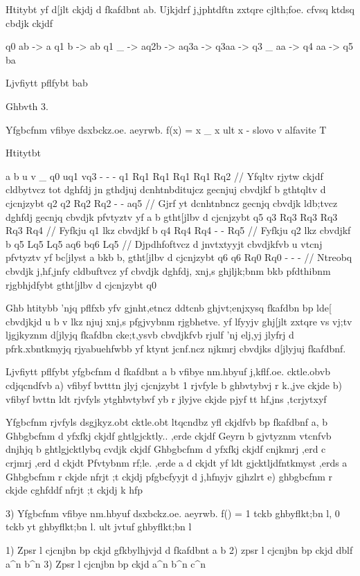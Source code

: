 Htitybt yf d[jlt ckjdj d fkafdbnt ab. Ujkjdrf j,jphtdftn zxtqre cjlth;foe. cfvsq ktdsq cbdjk ckjdf

q0 ab -> a q1 b ->  ab q1 _ -> aq2b -> aq3a -> q3aa -> q3 _ aa -> q4 aa -> q5 ba

Ljvfiytt pflfybt bab

Ghbvth 3.

Yfgbcfnm vfibye dsxbckz.oe. aeyrwb. f(x) = x _ x ult x - slovo v alfavite T

Htitytbt

	a    b    u    v   _
q0  uq1  vq3  -    -   -
q1  Rq1  Rq1  Rq1  Rq1  Rq2 // Yfqltv rjytw ckjdf cldbytvcz tot dghfdj jn gthdjuj dcnhtnbditujcz gecnjuj cbvdjkf b gthtqltv d cjcnjzybt q2
q2  Rq2  Rq2  -    -    aq5 // Gjrf yt dcnhtnbncz gecnjq cbvdjk ldb;tvcz dghfdj gecnjq cbvdjk pfvtyztv yf a b gtht[jlbv d cjcnjzybt q5
q3  Rq3  Rq3  Rq3  Rq3  Rq4  // Fyfkju q1 lkz cbvdjkf b 
q4 Rq4   Rq4  -    -    Rq5  // Fyfkju q2 lkz cbvdjkf b
q5 Lq5   Lq5  aq6  bq6 Lq5 // Djpdhfoftvcz d jnvtxtyyjt cbvdjkfvb u vtcnj pfvtyztv yf bc[jlyst a bkb b, gtht[jlbv d cjcnjzybt q6
q6 Rq0   Rq0 -     -    -   // Ntreobq cbvdjk j,hf,jnfy cldbuftvcz yf cbvdjk dghfdj, xnj,s ghjljk;bnm bkb pfdthibnm rjgbhjdfybt gtht[jlbv d cjcnjzybt q0

Ghb htitybb 'njq pflfxb yfv gjnht,etncz ddtcnb ghjvt;enjxysq fkafdbn bp lde[ cbvdjkjd u b v lkz njuj xnj,s pfgjvybnm rjgbhetve. yf lfyyjv ghj[jlt zxtqre vs vj;tv ljgjkyznm d[jlyjq fkafdbn cke;t,ysvb cbvdjkfvb rjulf 'nj elj,yj jlyfrj d pfrk.xbntkmyjq rjyabuehfwbb yf ktynt jcnf.ncz njkmrj cbvdjks d[jlyjuj fkafdbnf.

Ljvfiytt pflfybt yfgbcfnm d fkafdbnt a b vfibye nm.hbyuf j,kflf.oe. cktle.obvb cdjqcndfvb 
a) vfibyf bvtttn jlyj cjcnjzybt 1 rjvfyle b ghbvtybvj r k.,jve ckjde
b) vfibyf bvttn ldt rjvfyls ytghbvtybvf yb r jlyjve ckjde pjyf tt hf,jns ,tcrjytxyf

Yfgbcfnm rjvfyls dsgjkyz.obt cktle.obt ltqcndbz yfl ckjdfvb bp fkafdbnf a, b
Ghbgbcfnm d yfxfkj ckjdf ghtlgjcktly.. ,erde ckjdf 
Geyrn b gjvtyznm vtcnfvb dnjhjq b ghtlgjcktlybq cvdjk ckjdf
Ghbgbcfnm d yfxfkj ckjdf cnjkmrj ,erd c crjmrj ,erd d ckjdt
Pfvtybnm rf;le. ,erde a d ckjdt yf ldt gjcktljdfntkmyst ,erds a
Ghbgbcfnm r ckjde nfrjt ;t ckjdj pfgbcfyyjt d j,hfnyjv gjhzlrt
e) ghbgbcfnm r ckjde cghfddf nfrjt ;t ckjdj k hfp

3)
Yfgbcfnm vfibye nm.hbyuf dsxbckz.oe. aeyrwb. f(\omega) = 1 tckb \omega ghbyflkt;bn l, 0 tckb \omega yt ghbyflkt;bn l. ult jvtuf ghbyflkt;bn l

1) Zpsr l cjcnjbn bp ckjd gfkbylhjvjd d fkafdbnt a b
2) zpsr l cjcnjbn bp ckjd dblf a^n b^n
3) Zpsr l cjcnjbn bp ckjd a^n b^n c^n


